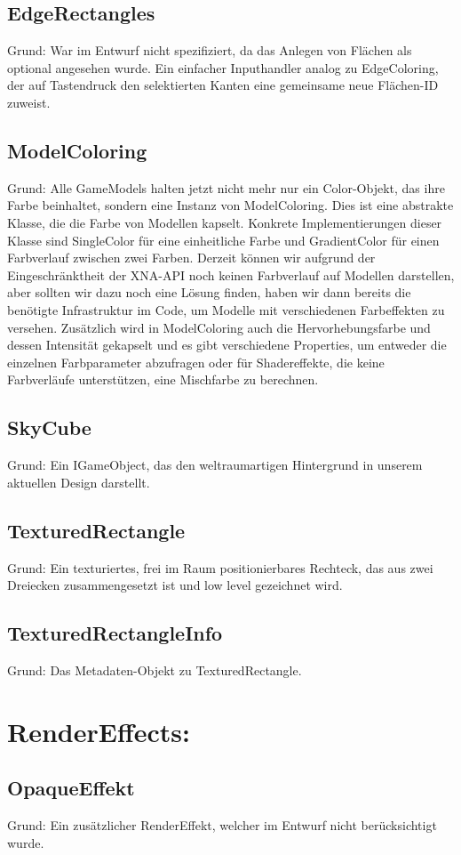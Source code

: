 \subsection{EdgeRectangles}
Grund: War im Entwurf nicht spezifiziert, da das Anlegen von Flächen als optional angesehen wurde. Ein einfacher Inputhandler analog zu EdgeColoring, der auf Tastendruck den selektierten Kanten eine gemeinsame neue Flächen-ID zuweist.
\subsection{ModelColoring}
Grund: Alle GameModels halten jetzt nicht mehr nur ein Color-Objekt, das ihre Farbe beinhaltet, sondern eine Instanz von ModelColoring. Dies ist eine abstrakte Klasse, die die Farbe von Modellen kapselt. Konkrete Implementierungen dieser Klasse sind SingleColor für eine einheitliche Farbe und GradientColor für einen Farbverlauf zwischen zwei Farben. Derzeit können wir aufgrund der Eingeschränktheit der XNA-API noch keinen Farbverlauf auf Modellen darstellen, aber sollten wir dazu noch eine Lösung finden, haben wir dann bereits die benötigte Infrastruktur im Code, um Modelle mit verschiedenen Farbeffekten zu versehen. Zusätzlich wird in ModelColoring auch die Hervorhebungsfarbe und dessen Intensität gekapselt und es gibt verschiedene Properties, um entweder die einzelnen Farbparameter abzufragen oder für Shadereffekte, die keine Farbverläufe unterstützen, eine Mischfarbe zu berechnen.
\subsection{SkyCube}
Grund: Ein IGameObject, das den weltraumartigen Hintergrund in unserem aktuellen Design darstellt.
\subsection{TexturedRectangle}
Grund: Ein texturiertes, frei im Raum positionierbares Rechteck, das aus zwei Dreiecken zusammengesetzt ist und low level gezeichnet wird.
\subsection{TexturedRectangleInfo}
Grund: Das Metadaten-Objekt zu TexturedRectangle.

\section{RenderEffects:}
\subsection{OpaqueEffekt}
Grund: Ein zusätzlicher RenderEffekt, welcher im Entwurf nicht berücksichtigt wurde.
